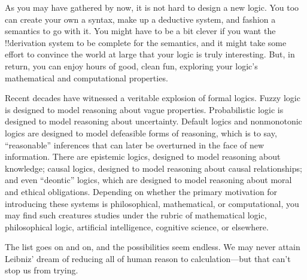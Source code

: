 \documentclass[../../../include/open-logic-section]{subfiles}
\begin{document}


As you may have gathered by now, it is not hard to design a new logic.
You too can create your own a syntax, make up a deductive system, and
fashion a semantics to go with it. You might have to be a bit clever
if you want the !!{derivation} system to be complete for the semantics, and it
might take some effort to convince the world at large that your logic
is truly interesting. But, in return, you can enjoy hours of good,
clean fun, exploring your logic's mathematical and computational
properties.

Recent decades have witnessed a veritable explosion of formal logics.
Fuzzy logic is designed to model reasoning about vague
properties. Probabilistic logic is designed to model
reasoning about uncertainty. Default logics and nonmonotonic logics
are designed to model defeasible forms of reasoning, which is
to say, ``reasonable'' inferences that can later be overturned in the
face of new information. There are epistemic logics, designed to
model reasoning about knowledge; causal logics, designed to
model reasoning about causal relationships; and even
``deontic'' logics, which are designed to model reasoning
about moral and ethical obligations. Depending on whether the primary
motivation for introducing these systems is philosophical,
mathematical, or computational, you may find such creatures studies
under the rubric of mathematical logic, philosophical logic,
artificial intelligence, cognitive science, or elsewhere.

The list goes on and on, and the possibilities seem endless. We
may never attain Leibniz' dream of reducing all of human reason to
calculation---but that can't stop us from trying.
\end{document}
